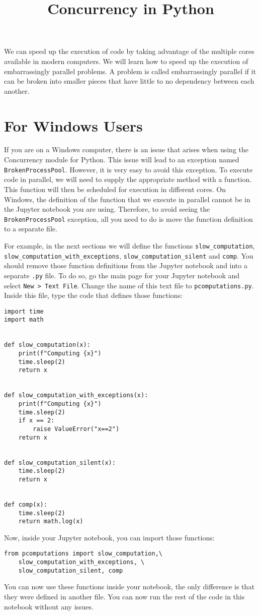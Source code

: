 \documentclass[12pt, a4paper]{article}
\date{}
\title{Concurrency in Python}
\begin{document}
\maketitle
We can speed up the execution of code by taking advantage of the multiple cores available in modern computers.
We will learn how to speed up the execution of embarrassingly parallel problems.
A problem is called embarrassingly parallel if it can be broken into smaller pieces that have little to no dependency between each another.
\section{For Windows Users}
\label{sec:org5af468f}
If you are on a Windows computer, there is an issue that arises when using the Concurrency module for Python.
This issue will lead to an exception named \texttt{BrokenProcessPool}.
However, it is very easy to avoid this exception.
To execute code in parallel, we will need to supply the appropriate method with a function.
This function will then be scheduled for execution in different cores.
On Windows, the definition of the function that we execute in parallel cannot be in the Jupyter notebook you are using.
Therefore, to avoid seeing the \texttt{BrokenProcessPool} exception, all you need to do is move the function definition to a separate file.

For example, in the next sections we will define the functions \texttt{slow\_computation}, \texttt{slow\_computation\_with\_exceptions}, \texttt{slow\_computation\_silent} and \texttt{comp}.
You should remove those function definitions from the Jupyter notebook and into a separate \texttt{.py} file.
To do so, go the main page for your Jupyter notebook and select \texttt{New > Text File}.
Change the name of this text file to \texttt{pcomputations.py}.
Inside this file, type the code that defines those functions:
\lstset{language=jupyter-python,label= ,caption= ,captionpos=b,numbers=none}
\begin{lstlisting}
import time
import math


def slow_computation(x):
    print(f"Computing {x}")
    time.sleep(2)
    return x


def slow_computation_with_exceptions(x):
    print(f"Computing {x}")
    time.sleep(2)
    if x == 2:
        raise ValueError("x==2")
    return x


def slow_computation_silent(x):
    time.sleep(2)
    return x


def comp(x):
    time.sleep(2)
    return math.log(x)
\end{lstlisting}
Now, inside your Jupyter notebook, you can import those functions:
\lstset{language=jupyter-python,label= ,caption= ,captionpos=b,numbers=none}
\begin{lstlisting}
from pcomputations import slow_computation,\
    slow_computation_with_exceptions, \
    slow_computation_silent, comp
\end{lstlisting}
You can now use these functions inside your notebook, the only difference is that they were defined in another file.
You can now run the rest of the code in this notebook without any issues.
\end{document}
